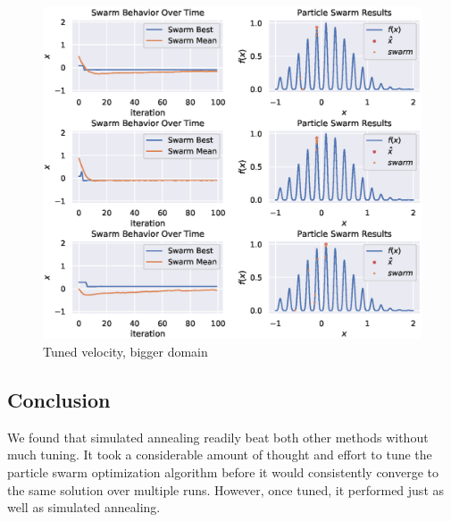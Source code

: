 \documentclass[12pt]{article}
\begin{document}
\begin{figure}[H]
    \centering
    \includegraphics[width=\textwidth]{figures/pso/pso-tuned-vel-bigger-domain.eps}
    \caption{Tuned velocity, bigger domain}\label{fig:pso:tuned-vel-bigger-domain}
\end{figure}

\subsection{Conclusion}
We found that simulated annealing readily beat both other methods without much tuning.
It took a considerable amount of thought and effort to tune the particle swarm optimization algorithm before it would consistently converge to the same solution over multiple runs.
However, once tuned, it performed just as well as simulated annealing.
\end{document}
